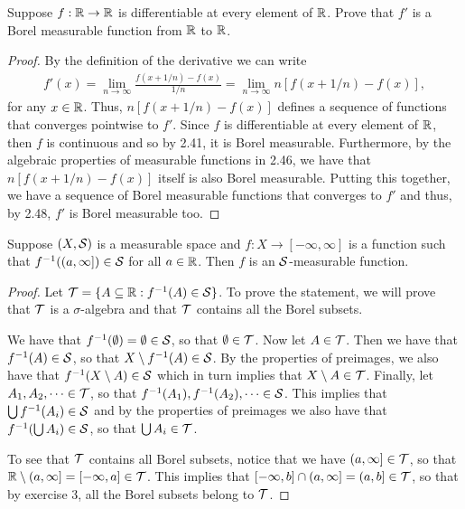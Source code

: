 \begin{exercise}{18}
Suppose $f:\mathbb{R}\to\mathbb{R}$ is differentiable at every element of $\mathbb{R}$.
Prove that $f'$ is a Borel measurable function from $\mathbb{R}$ to $\mathbb{R}$.
\end{exercise}
\begin{proof}
By the definition of the derivative we can write
\begin{align*}
    f'(x) = \lim_{n\to\infty}\frac{f(x+1/n)-f(x)}{1/n} = \lim_{n\to\infty}n[f(x+1/n)-f(x)],
\end{align*}
for any $x\in\mathbb{R}$.
Thus, $n[f(x+1/n)-f(x)]$ defines a sequence of functions that converges pointwise to $f'$.
Since $f$ is differentiable at every element of $\mathbb{R}$, then $f$ is continuous and so by 2.41, it is Borel measurable.
Furthermore, by the algebraic properties of measurable functions in 2.46, we have that $n[f(x+1/n)-f(x)]$ itself is also Borel measurable.
Putting this together, we have a sequence of Borel measurable functions that converges to $f'$ and thus, by 2.48, $f'$ is Borel measurable too.
\end{proof} 

\begin{exercise}{21}
Suppose $(X,\mathcal{S})$ is a measurable space and $f: X \to [-\infty,\infty]$ is a function such that $f^{-1}((a,\infty]) \in \mathcal{S}$ for all $a\in\mathbb{R}$.
Then $f$ is an $\mathcal{S}$-measurable function.
\end{exercise}
\begin{proof}
Let $\mathcal{T} = \{A\subseteq\mathbb{R}: f^{-1}(A)\in \mathcal{S}\}$.
To prove the statement, we will prove that $\mathcal{T}$ is a $\sigma$-algebra and that $\mathcal{T}$ contains all the Borel subsets.

We have that $f^{-1}(\emptyset) = \emptyset \in \mathcal{S}$, so that $\emptyset \in \mathcal{T}$.
Now let $A\in \mathcal{T}$.
Then we have that $f^{-1}(A) \in \mathcal{S}$, so that $X\setminus f^{-1}(A) \in \mathcal{S}$.
By the properties of preimages, we also have that $f^{-1}(X\setminus A) \in \mathcal{S}$ which in turn implies that $X\setminus A \in \mathcal{T}$.
Finally, let $A_1,A_2,\dots \in \mathcal{T}$, so that $f^{-1}(A_1),f^{-1}(A_2),\dots \in \mathcal{S}$.
This implies that $\bigcup f^{-1}(A_i) \in \mathcal{S}$ and by the properties of preimages we also have that $f^{-1}(\bigcup A_i) \in \mathcal{S}$, so that $\bigcup A_i \in \mathcal{T}$.

To see that $\mathcal{T}$ contains all Borel subsets, notice that we have $(a,\infty] \in \mathcal{T}$, so that $\mathbb{R}\setminus (a,\infty] =  [-\infty, a] \in \mathcal{T}$.
This implies that $[-\infty, b] \cap (a,\infty] = (a,b] \in \mathcal{T}$, so that by exercise 3, all the Borel subsets belong to $\mathcal{T}$.
\end{proof} 

